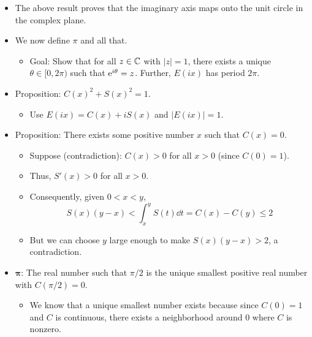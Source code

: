 \documentclass[../notes.tex]{subfiles}
\begin{document}
\begin{itemize}
    \begin{itemize}
        \item We have that
        \begin{equation*}
            |E(ix)|^2 = E(ix)\overline{E(ix)}
            = E(ix)E(-ix)
            = E(0)
            = 1
        \end{equation*}
        \item Taking square roots of both sides yields the desired result.
    \end{itemize}
    \item The above result proves that the imaginary axis maps onto the unit circle in the complex plane.
    \item We now define $\pi$ and all that.
    \begin{itemize}
        \item Goal: Show that for all $z\in\C$ with $|z|=1$, there exists a unique $\theta\in[0,2\pi)$ such that $\e[i\theta]=z$. Further, $E(ix)$ has period $2\pi$.
    \end{itemize}
    \item Proposition: $C(x)^2+S(x)^2=1$.
    \begin{itemize}
        \item Use $E(ix)=C(x)+iS(x)$ and $|E(ix)|=1$.
    \end{itemize}
    \item Proposition: There exists some positive number $x$ such that $C(x)=0$.
    \begin{itemize}
        \item Suppose (contradiction): $C(x)>0$ for all $x>0$ (since $C(0)=1$).
        \item Thus, $S'(x)>0$ for all $x>0$.
        \item Consequently, given $0<x<y$,
        \begin{equation*}
            S(x)(y-x) < \int_x^yS(t)\dd{t}
            = C(x)-C(y)
            \leq 2
        \end{equation*}
        \item But we can choose $y$ large enough to make $S(x)(y-x)>2$, a contradiction.
    \end{itemize}
    \item $\bm{\pi}$: The real number such that $\pi/2$ is the unique smallest positive real number with $C(\pi/2)=0$.
    \begin{itemize}
        \item We know that a unique smallest number exists because since $C(0)=1$ and $C$ is continuous, there exists a neighborhood around 0 where $C$ is nonzero.

\end{itemize}
\end{itemize}
\end{document}
